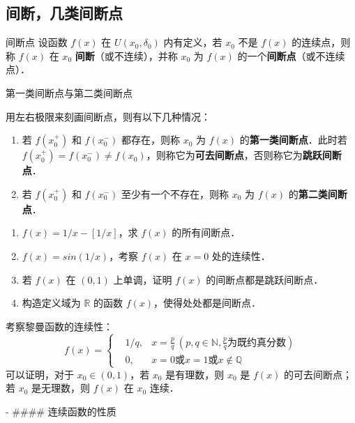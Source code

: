 \subsection{间断，几类间断点}
\begin{definition}{间断点}
  设函数 $f(x)$ 在 $U(x_0,\delta_0)$ 内有定义，若 $x_0$ 不是 $f(x)$ 的连续点，则称 $f(x)$ 在 $x_0$ \textbf{间断}（或不连续），并称 $x_0$ 为 $f(x)$ 的一个\textbf{间断点}（或不连续点）．
\end{definition}
\begin{definition}{第一类间断点与第二类间断点}

用左右极限来刻画间断点，则有以下几种情况：
\begin{enumerate}
\item 若 $f(x_0^+)$ 和 $f(x_0^-)$ 都存在，则称 $x_0$ 为 $f(x)$ 的\textbf{第一类间断点}．此时若 $f(x_0^+)=f(x_0^-)\neq f(x_0)$，则称它为\textbf{可去间断点}，否则称它为\textbf{跳跃间断点}．
\item 若 $f(x_0^+)$ 和 $f(x_0^-)$ 至少有一个不存在，则称 $x_0$ 为 $f(x)$ 的\textbf{第二类间断点}．
\end{enumerate}
\end{definition}

\begin{exercise}{}
\begin{enumerate}
\item $f(x)=1/x-[1/x]$，求 $f(x)$ 的所有间断点．
\item $f(x)=sin(1/x)$，考察 $f(x)$ 在 $x=0$ 处的连续性．
\item 若 $f(x)$ 在 $(0,1)$ 上单调，证明 $f(x)$ 的间断点都是跳跃间断点．
\item 构造定义域为 $\mathbb{R}$ 的函数 $f(x)$，使得处处都是间断点． 
\end{enumerate}
\end{exercise}
  
考察黎曼函数的连续性：
\begin{equation}
f(x)=\left\{
\begin{aligned}
&1/q, &x=\frac{p}{q}\ (p,q\in \mathbb{N}, \frac{p}{q}\text{为既约真分数})\\
&0,&x=0\text{或}x=1\text{或} x\notin \mathbb{Q}
\end{aligned} \right.
\end{equation}
可以证明，对于 $x_0\in(0,1)$，若 $x_0$ 是有理数，则 $x_0$ 是 $f(x)$ 的可去间断点；若 $x_0$ 是无理数，则 $f(x)$ 在 $x_0$ 连续．

  

- #### 连续函数的性质

